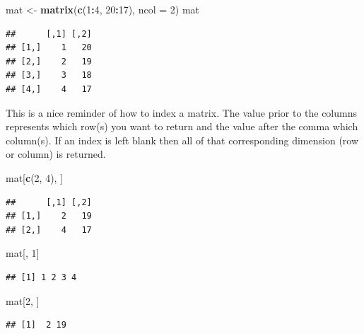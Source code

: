 \documentclass[
]{book}
\newenvironment{Shaded}{\begin{snugshade}}{\end{snugshade}}
\newcommand{\DataTypeTok}[1]{\textcolor[rgb]{0.13,0.29,0.53}{#1}}
\newcommand{\DecValTok}[1]{\textcolor[rgb]{0.00,0.00,0.81}{#1}}
\newcommand{\KeywordTok}[1]{\textcolor[rgb]{0.13,0.29,0.53}{\textbf{#1}}}
\newcommand{\NormalTok}[1]{#1}
\newcommand{\OperatorTok}[1]{\textcolor[rgb]{0.81,0.36,0.00}{\textbf{#1}}}
\newcommand{\StringTok}[1]{\textcolor[rgb]{0.31,0.60,0.02}{#1}}
\theoremstyle{definition}
\theoremstyle{definition}
\theoremstyle{definition}
\theoremstyle{remark}
\begin{document}
\begin{Shaded}
\begin{Highlighting}[]
\NormalTok{mat <-}\StringTok{ }\KeywordTok{matrix}\NormalTok{(}\KeywordTok{c}\NormalTok{(}\DecValTok{1}\OperatorTok{:}\DecValTok{4}\NormalTok{, }\DecValTok{20}\OperatorTok{:}\DecValTok{17}\NormalTok{), }\DataTypeTok{ncol =} \DecValTok{2}\NormalTok{)}
\NormalTok{mat}
\end{Highlighting}
\end{Shaded}

\begin{verbatim}
##      [,1] [,2]
## [1,]    1   20
## [2,]    2   19
## [3,]    3   18
## [4,]    4   17
\end{verbatim}

This is a nice reminder of how to index a matrix. The value prior to the columns represents which row(s) you want to return and the value after the comma which column(s). If an index is left blank then all of that corresponding dimension (row or column) is returned.

\begin{Shaded}
\begin{Highlighting}[]
\NormalTok{mat[}\KeywordTok{c}\NormalTok{(}\DecValTok{2}\NormalTok{, }\DecValTok{4}\NormalTok{), ]}
\end{Highlighting}
\end{Shaded}

\begin{verbatim}
##      [,1] [,2]
## [1,]    2   19
## [2,]    4   17
\end{verbatim}

\begin{Shaded}
\begin{Highlighting}[]
\NormalTok{mat[, }\DecValTok{1}\NormalTok{]}
\end{Highlighting}
\end{Shaded}

\begin{verbatim}
## [1] 1 2 3 4
\end{verbatim}

\begin{Shaded}
\begin{Highlighting}[]
\NormalTok{mat[}\DecValTok{2}\NormalTok{, ]}
\end{Highlighting}
\end{Shaded}

\begin{verbatim}
## [1]  2 19
\end{verbatim}
\end{document}
